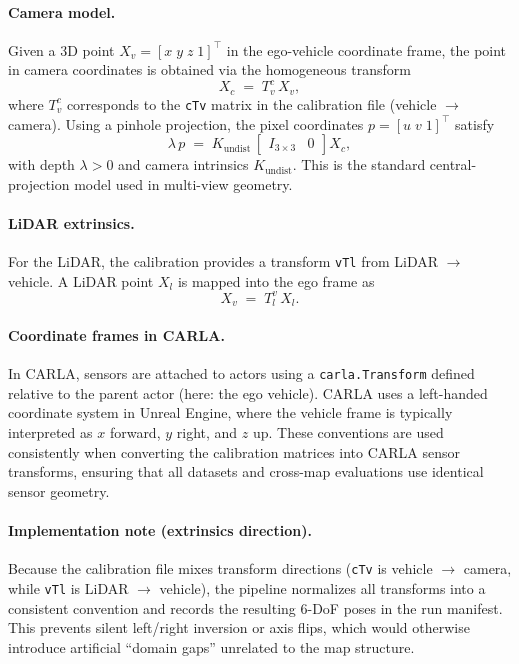 \paragraph{Camera model.}
Given a 3D point $X_v = [x\;y\;z\;1]^\top$ in the ego-vehicle coordinate frame, the point in camera coordinates is obtained via the homogeneous transform
\begin{equation}
X_c \;=\; T^{c}_{v}\, X_v ,
\end{equation}
where $T^{c}_{v}$ corresponds to the \texttt{cTv} matrix in the calibration file (vehicle $\rightarrow$ camera).
Using a pinhole projection, the pixel coordinates $p = [u\;v\;1]^\top$ satisfy
\begin{equation}
\lambda\, p \;=\; K_{\text{undist}}\, \begin{bmatrix} I_{3\times 3} & 0 \end{bmatrix} X_c,
\end{equation}
with depth $\lambda>0$ and camera intrinsics $K_{\text{undist}}$.
This is the standard central-projection model used in multi-view geometry. \cite{hartley2004multipleview}

\paragraph{LiDAR extrinsics.}
For the LiDAR, the calibration provides a transform \texttt{vTl} from LiDAR $\rightarrow$ vehicle.
A LiDAR point $X_l$ is mapped into the ego frame as
\begin{equation}
X_v \;=\; T^{v}_{l}\, X_l .
\end{equation}

\paragraph{Coordinate frames in CARLA.}
In CARLA, sensors are attached to actors using a \texttt{carla.}\allowbreak\texttt{Transform} defined relative to the parent actor (here: the ego vehicle). \cite{carla_docs_sensors}
CARLA uses a left-handed coordinate system in Unreal Engine, where the vehicle frame is typically interpreted as $x$ forward, $y$ right, and $z$ up. \cite{carla_docs_transforms}
These conventions are used consistently when converting the calibration matrices into CARLA sensor transforms, ensuring that all datasets and cross-map evaluations use identical sensor geometry.

\paragraph{Implementation note (extrinsics direction).}
Because the calibration file mixes transform directions (\texttt{cTv} is vehicle $\rightarrow$ camera, while \texttt{vTl} is LiDAR $\rightarrow$ vehicle), the pipeline normalizes all transforms into a consistent convention and records the resulting 6-DoF poses in the run manifest.
This prevents silent left/right inversion or axis flips, which would otherwise introduce artificial ``domain gaps'' unrelated to the map structure.

